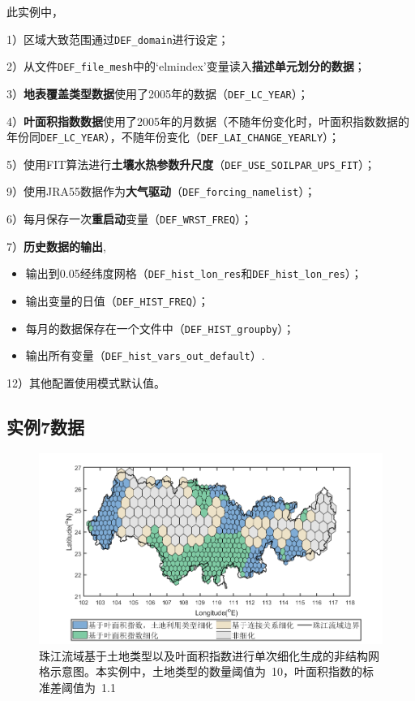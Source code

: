 此实例中，\par
1）区域大致范围通过\texttt{DEF\_domain}进行设定；\par
2）从文件\texttt{DEF\_file\_mesh}中的`elmindex'变量读入\textbf{描述单元划分的数据}；\par
3）\textbf{地表覆盖类型数据}使用了2005年的数据（\texttt{DEF\_LC\_YEAR}）；\par
4）\textbf{叶面积指数数据}使用了2005年的月数据（不随年份变化时，叶面积指数数据的年份同\texttt{DEF\_LC\_YEAR}），不随年份变化（\texttt{DEF\_LAI\_CHANGE\_YEARLY}）；\par
5）使用FIT算法进行\textbf{土壤水热参数升尺度}（\texttt{DEF\_USE\_SOILPAR\_UPS\_FIT}）；\par
9）使用JRA55数据作为\textbf{大气驱动}（\texttt{DEF\_forcing\_namelist}）；\par
6）每月保存一次\textbf{重启动}变量（\texttt{DEF\_WRST\_FREQ}）；\par
7）\textbf{历史数据的输出},
\begin{itemize}[nosep,leftmargin=4em]
    \item 输出到0.05\textdegree 经纬度网格（\texttt{DEF\_hist\_lon\_res}和\texttt{DEF\_hist\_lon\_res}）；
    \item 输出变量的日值（\texttt{DEF\_HIST\_FREQ}）；
    \item 每月的数据保存在一个文件中（\texttt{DEF\_HIST\_groupby}）；
    \item 输出所有变量（\texttt{DEF\_hist\_vars\_out\_default}）.
\end{itemize}\par
12）其他配置使用模式默认值。


\subsection{实例7数据}

\begin{figure}[htpb]
    \centering
    \includegraphics[width=\textwidth]{figures/Example07_PearlRiver_unstr_Mesh.jpg}
    \caption{珠江流域基于土地类型以及叶面积指数进行单次细化生成的非结构网格示意图。本实例中，土地类型的数量阈值为~10，叶面积指数的标准差阈值为~1.1}
    \label{fig:fig_pearlriver_unstr}
\end{figure}

